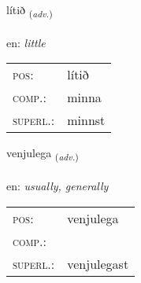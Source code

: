 \documentclass[frontgrid, backgrid]{flacards}\usepackage[]{graphicx}\usepackage[]{color}
\begin{document}
\renewcommand{\flhead}{\vskip5pt \fboxsep=0pt {\small\bfseries\footnotesize Atviksorð | Adverb}}
\renewcommand{\fcfoot}{\vskip5pt \fboxsep=0pt \hspace{2pt}{\small\bfseries\footnotesize 2K}}

\renewcommand{\blhead}{\vskip5pt {\small\bfseries\footnotesize Atviksorð | Adverb }}
\renewcommand{\bcfoot}{\vskip5pt \hspace{2pt}{\small\bfseries\footnotesize 2K}}


{lítið \small{\textsubscript{(\textit{adv.})}} \\[1ex] %
\textphonetic{[liːtɪð]} \\
en: \emph{little} \\  [2ex]
\renewcommand*{\arraystretch}{0.8}
\begin{tabular}{ll}
\textsc{pos}: & lítið \\ 
\textsc{comp.}: & minna \\ 
\textsc{superl.}: & minnst \\
\end{tabular}
}

\renewcommand{\flhead}{\vskip5pt \fboxsep=0pt {\small\bfseries\footnotesize Atviksorð | Adverb}}
\renewcommand{\fcfoot}{\vskip5pt \fboxsep=0pt \hspace{2pt}{\small\bfseries\footnotesize 2K}}

\renewcommand{\blhead}{\vskip5pt {\small\bfseries\footnotesize Atviksorð | Adverb }}
\renewcommand{\bcfoot}{\vskip5pt \hspace{2pt}{\small\bfseries\footnotesize 2K}}


{venjulega \small{\textsubscript{(\textit{adv.})}} \\[1ex] %
\textphonetic{[vɛnjʏlɛɣa]} \\
en: \emph{usually, generally} \\  [2ex]
\renewcommand*{\arraystretch}{0.8}
\begin{tabular}{ll}
\textsc{pos}: & venjulega \\ 
\textsc{comp.}: &  \\ 
\textsc{superl.}: & venjulegast \\
\end{tabular}
}
\end{document}
